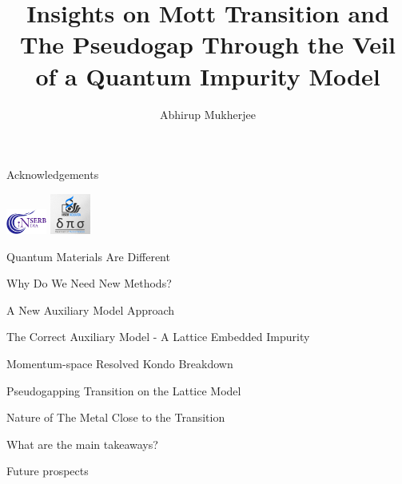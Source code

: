 \documentclass[11pt,aspectratio=169]{beamer}
\title{Insights on Mott Transition and The Pseudogap Through the Veil of a Quantum Impurity Model}
\author{Abhirup Mukherjee}
\institute{DPS Day '25 \\ Department of Physical Sciences, IISER Kolkata}
\begin{document}
\centering

\begin{frame}
\maketitle
\end{frame}

\begin{frame}{Acknowledgements}

	\hspace*{\fill}
	\includegraphics[width=0.1\textwidth]{SERB.png}
	\hspace*{\fill}
	\includegraphics[width=0.1\textwidth]{dps_logo.jpeg}
	\hspace*{\fill}
\end{frame}

\begin{frame}{Quantum Materials Are Different}
\end{frame}

\begin{frame}{Why Do We Need New Methods?}
\end{frame}

\begin{frame}{A New Auxiliary Model Approach}
\end{frame}

\begin{frame}{The Correct Auxiliary Model - A Lattice Embedded Impurity}
\end{frame}

\begin{frame}{Momentum-space Resolved Kondo Breakdown}
\end{frame}

\begin{frame}{Pseudogapping Transition on the Lattice Model}
\end{frame}

\begin{frame}{Nature of The Metal Close to the Transition}
\end{frame}

\begin{frame}{What are the main takeaways?}
\end{frame}

\begin{frame}{Future prospects}
\end{frame}
\end{document}
